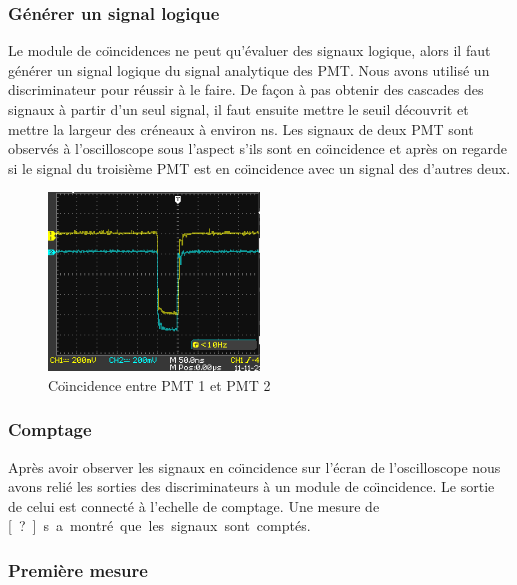 \documentclass[a4paper,11pt,liststotocnumbered,bibtotocnumbered]{scrartcl}
\begin{document}
   \subsubsection{Générer un signal logique}
     Le module de co\"{\i}ncidences ne peut qu'évaluer des signaux logique, alors il faut générer un signal logique du signal analytique des PMT. Nous avons utilisé un discriminateur pour réussir à le faire. De fa\c con à pas obtenir des cascades des signaux à partir d'un seul signal, il faut ensuite mettre le seuil découvrit et mettre la largeur des créneaux à environ \unit[600]{ns}. Les signaux de deux PMT sont observés à l'oscilloscope sous l'aspect s'ils sont en co\"{\i}ncidence et après on regarde si le signal du troisième PMT est en co\"{\i}ncidence avec un signal des d'autres deux.
    \begin{figure}
     \centering
     \includegraphics[width=0.5\textwidth]{bilder/coinvrai.png}
     \caption{Co\"{\i}ncidence entre PMT 1 et PMT 2}
    \end{figure}
  
   \subsubsection{Comptage}
    Après avoir observer les signaux en co\"{\i}ncidence sur l'écran de l'oscilloscope nous avons relié les sorties des discriminateurs à un module de co\"{\i}ncidence. Le sortie de celui est connecté à l'echelle de comptage. Une mesure de \unit[?]{s} a montré que les signaux sont comptés.
   
   
   \subsubsection{Première mesure}
\end{document}
